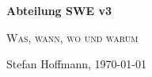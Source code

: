 \begin{titlepage}
	\centering
	\vspace*{5cm}
	{\huge\bfseries Abteilung SWE v3\par}
	{\scshape\LARGE Was, wann, wo und warum\par}
	\vspace{2cm}
	{\Large\itshape \par}
	\vfill
	{\large Stefan Hoffmann, \today\par}
\end{titlepage}
